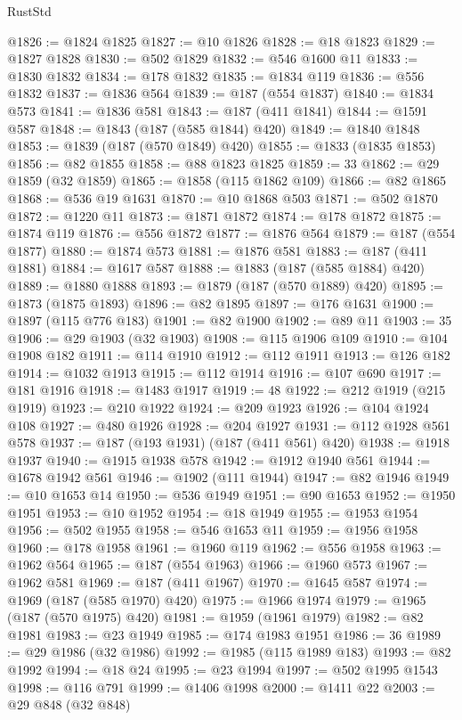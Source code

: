 \begin{lexlean}{RustStd}
\begin{coremodule}
@1826 := @1824 @1825
@1827 := @10 @1826
@1828 := @18 @1823
@1829 := @1827 @1828
@1830 := @502 @1829
@1832 := @546 @1600 @11
@1833 := @1830 @1832
@1834 := @178 @1832
@1835 := @1834 @119
@1836 := @556 @1832
@1837 := @1836 @564
@1839 := @187 (@554 @1837)
@1840 := @1834 @573
@1841 := @1836 @581
@1843 := @187 (@411 @1841)
@1844 := @1591 @587
@1848 := @1843 (@187 (@585 @1844) @420)
@1849 := @1840 @1848
@1853 := @1839 (@187 (@570 @1849) @420)
@1855 := @1833 (@1835 @1853)
@1856 := @82 @1855
@1858 := @88 @1823 @1825
@1859 := 33
@1862 := @29 @1859 (@32 @1859)
@1865 := @1858 (@115 @1862 @109)
@1866 := @82 @1865
@1868 := @536 @19 @1631
@1870 := @10 @1868 @503
@1871 := @502 @1870
@1872 := @1220 @11
@1873 := @1871 @1872
@1874 := @178 @1872
@1875 := @1874 @119
@1876 := @556 @1872
@1877 := @1876 @564
@1879 := @187 (@554 @1877)
@1880 := @1874 @573
@1881 := @1876 @581
@1883 := @187 (@411 @1881)
@1884 := @1617 @587
@1888 := @1883 (@187 (@585 @1884) @420)
@1889 := @1880 @1888
@1893 := @1879 (@187 (@570 @1889) @420)
@1895 := @1873 (@1875 @1893)
@1896 := @82 @1895
@1897 := @176 @1631
@1900 := @1897 (@115 @776 @183)
@1901 := @82 @1900
@1902 := @89 @11
@1903 := 35
@1906 := @29 @1903 (@32 @1903)
@1908 := @115 @1906 @109
@1910 := @104 @1908 @182
@1911 := @114 @1910
@1912 := @112 @1911
@1913 := @126 @182
@1914 := @1032 @1913
@1915 := @112 @1914
@1916 := @107 @690
@1917 := @181 @1916
@1918 := @1483 @1917
@1919 := 48
@1922 := @212 @1919 (@215 @1919)
@1923 := @210 @1922
@1924 := @209 @1923
@1926 := @104 @1924 @108
@1927 := @480 @1926
@1928 := @204 @1927
@1931 := @112 @1928 @561 @578
@1937 := @187 (@193 @1931) (@187 (@411 @561) @420)
@1938 := @1918 @1937
@1940 := @1915 @1938 @578
@1942 := @1912 @1940 @561
@1944 := @1678 @1942 @561
@1946 := @1902 (@111 @1944)
@1947 := @82 @1946
@1949 := @10 @1653 @14
@1950 := @536 @1949
@1951 := @90 @1653
@1952 := @1950 @1951
@1953 := @10 @1952
@1954 := @18 @1949
@1955 := @1953 @1954
@1956 := @502 @1955
@1958 := @546 @1653 @11
@1959 := @1956 @1958
@1960 := @178 @1958
@1961 := @1960 @119
@1962 := @556 @1958
@1963 := @1962 @564
@1965 := @187 (@554 @1963)
@1966 := @1960 @573
@1967 := @1962 @581
@1969 := @187 (@411 @1967)
@1970 := @1645 @587
@1974 := @1969 (@187 (@585 @1970) @420)
@1975 := @1966 @1974
@1979 := @1965 (@187 (@570 @1975) @420)
@1981 := @1959 (@1961 @1979)
@1982 := @82 @1981
@1983 := @23 @1949
@1985 := @174 @1983 @1951
@1986 := 36
@1989 := @29 @1986 (@32 @1986)
@1992 := @1985 (@115 @1989 @183)
@1993 := @82 @1992
@1994 := @18 @24
@1995 := @23 @1994
@1997 := @502 @1995 @1543
@1998 := @116 @791
@1999 := @1406 @1998
@2000 := @1411 @22
@2003 := @29 @848 (@32 @848)

\end{coremodule}
\end{lexlean}
